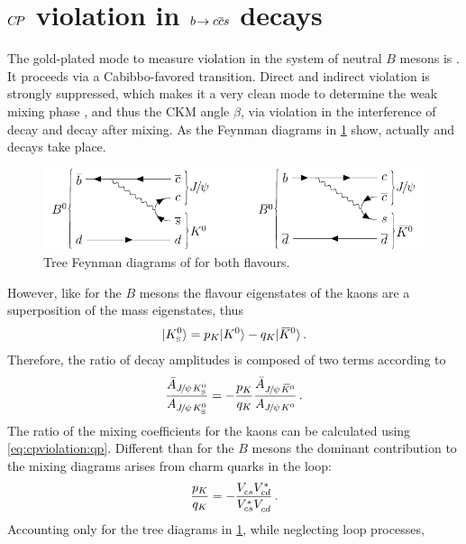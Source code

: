 
\section{\texorpdfstring{${C\!P}$}{CP} violation in \texorpdfstring{${b}\!\rightarrow {\ensuremath{c}}{\ensuremath{\overline {{c}}}}{\ensuremath{s}}$}{bToccbars} decays}
\label{sec:cpviolation:btoccbars}

The gold-plated mode to measure \CP violation in the system of neutral $B$
mesons is \BdToJPsiKS. It proceeds via a Cabibbo-favored \bToccbars
transition. Direct and indirect \CP violation is strongly suppressed, which
makes it a very clean mode to determine the weak mixing phase \phid, and thus the
CKM angle $\beta$, via \CP violation in the interference of decay and decay
after mixing. As the Feynman diagrams in
\cref{fig:cpviolation:bd2jpsiks_feynmans} show, actually
\BdToJPsiKz and \BdbToJPsiKzb decays take place.
\begin{figure}[htb]
\centering
\includegraphics[width=\textwidth]{03-CPViolation/tikz/pdf/BdToJPsiKS_Feynmans.pdf}
\caption{Tree Feynman diagrams of \BdToJPsiKS for both flavours.}
\label{fig:cpviolation:bd2jpsiks_feynmans}
\end{figure}
However, like for the $B$ mesons the flavour eigenstates of the kaons are a
superposition of the \CP mass eigenstates, thus
\begin{align}
	|{{K}^0_{\mathrm{ \scriptscriptstyle S}}}\rangle = p_K |{{K}^0}\rangle - q_K |{{\kern 0.2em\overline{\kern -0.2em K}{}}{}^0}\rangle\,.
\end{align}
Therefore, the ratio of decay amplitudes is composed of two terms according to
\begin{align}
	\frac{\bar{A}_{{{J\mskip -3mu/\mskip -2mu\psi\mskip 2mu}}{{K}^0_{\mathrm{ \scriptscriptstyle S}}}}}{A_{{{J\mskip -3mu/\mskip -2mu\psi\mskip 2mu}}{{K}^0_{\mathrm{ \scriptscriptstyle S}}}}} = -\frac{p_K}{q_K}\frac{\bar{A}_{{{J\mskip -3mu/\mskip -2mu\psi\mskip 2mu}}{{\kern 0.2em\overline{\kern -0.2em K}{}}{}^0}}}{A_{{{J\mskip -3mu/\mskip -2mu\psi\mskip 2mu}}{{K}^0}}}\,.
\end{align}
The ratio of the mixing coefficients for the kaons can be calculated using
\cref{eq:cpviolation:qp}. Different than for the $B$ mesons the dominant
contribution to the mixing diagrams arises from charm quarks in the loop:
\begin{align}
	\frac{p_K}{q_K} = -\frac{{V_{{c}{s}}^{}}{V_{{c}{d}}^\ast}}{{V_{{c}{s}}^\ast}{V_{{c}{d}}^{}}}\,.
\end{align}
Accounting only for the tree diagrams in
\cref{fig:cpviolation:bd2jpsiks_feynmans}, while neglecting loop processes,

